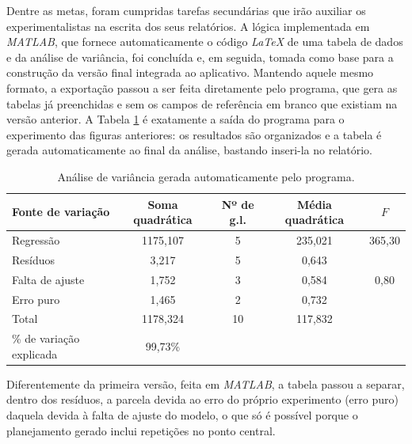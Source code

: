 \documentclass[12pt]{article}
\begin{document}
Dentre as metas, foram cumpridas tarefas secundárias que irão auxiliar os experimentalistas na escrita dos seus relatórios. A lógica implementada em \textit{MATLAB}, que fornece automaticamente o código \textit{LaTeX} de uma tabela de dados e da análise de variância, foi concluída e, em seguida, tomada como base para a construção da versão final integrada ao aplicativo. Mantendo aquele mesmo formato, a exportação passou a ser feita diretamente pelo programa, que gera as tabelas já preenchidas e sem os campos de referência em branco que existiam na versão anterior. A Tabela \ref{tab:ANOVA} é exatamente a saída do programa para o experimento das figuras anteriores: os resultados são organizados e a tabela é gerada automaticamente ao final da análise, bastando inseri-la no relatório.

\begin{table}[H]
	\centering
	\caption{Análise de variância gerada automaticamente pelo programa.}
	\label{tab:ANOVA}

	\renewcommand{\arraystretch}{1.25}
	\begin{tabular}{l c c c c}
		\toprule
		\textbf{Fonte de variação}  & \textbf{Soma quadrática} & \textbf{Nº de g.l.} & \textbf{Média quadrática} & \textbf{$F$} \\
		\midrule
		Regressão                   & 1175,107                 & 5                   & 235,021                   & 365,30       \\
		Resíduos                    & 3,217                    & 5                   & 0,643                     &              \\
		\quad Falta de ajuste       & 1,752                    & 3                   & 0,584                     & 0,80         \\
		\quad Erro puro             & 1,465                    & 2                   & 0,732                     &              \\
		\midrule
		Total                       & 1178,324                 & 10                  & 117,832                   &              \\
		\midrule
		\% de variação explicada    & 99,73\%                  &                     &                           &              \\
		\bottomrule
	\end{tabular}
\end{table}

Diferentemente da primeira versão, feita em \textit{MATLAB}, a tabela passou a separar, dentro dos resíduos, a parcela devida ao erro do próprio experimento (erro puro) daquela devida à falta de ajuste do modelo, o que só é possível porque o planejamento gerado inclui repetições no ponto central.
\end{document}
